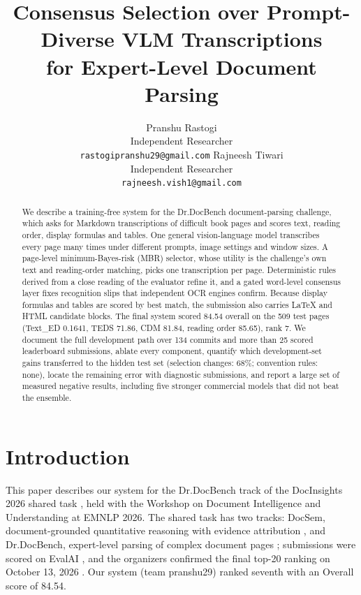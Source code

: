 \documentclass[11pt]{article}
\title{Consensus Selection over Prompt-Diverse VLM Transcriptions\\for Expert-Level Document Parsing}
\author{Pranshu Rastogi \\
  Independent Researcher \\
  \texttt{rastogipranshu29@gmail.com} \And
  Rajneesh Tiwari \\
  Independent Researcher \\
  \texttt{rajneesh.vish1@gmail.com}}
\begin{document}
\maketitle

\begin{abstract}
We describe a training-free system for the Dr.DocBench document-parsing challenge, which asks for Markdown transcriptions of difficult book pages and scores text, reading order, display formulas and tables. One general vision-language model transcribes every page many times under different prompts, image settings and window sizes. A page-level minimum-Bayes-risk (MBR) selector, whose utility is the challenge's own text and reading-order matching, picks one transcription per page. Deterministic rules derived from a close reading of the evaluator refine it, and a gated word-level consensus layer fixes recognition slips that independent OCR engines confirm. Because display formulas and tables are scored by best match, the submission also carries LaTeX and HTML candidate blocks. The final system scored 84.54 overall on the 509 test pages (Text\_ED 0.1641, TEDS 71.86, CDM 81.84, reading order 85.65), rank 7. We document the full development path over 134 commits and more than 25 scored leaderboard submissions, ablate every component, quantify which development-set gains transferred to the hidden test set (selection changes: 68\%; convention rules: none), locate the remaining error with diagnostic submissions, and report a large set of measured negative results, including five stronger commercial models that did not beat the ensemble.
\par{}
\end{abstract}

\section{Introduction}
This paper describes our system for the Dr.DocBench track of the DocInsights 2026 shared task \citep{docinsights2026}, held with the Workshop on Document Intelligence and Understanding at EMNLP 2026. The shared task has two tracks: DocSem, document-grounded quantitative reasoning with evidence attribution \citep{docsem}, and Dr.DocBench, expert-level parsing of complex document pages \citep{drdocbench, drdocbenchchallenge}; submissions were scored on EvalAI \citep{evalai}, and the organizers confirmed the final top-20 ranking on October 13, 2026 \citep{drdocbenchfinal}. Our system (team pranshu29) ranked seventh with an Overall score of 84.54.
\end{document}
